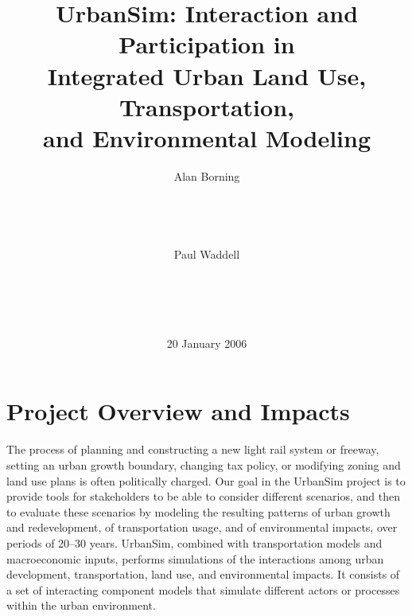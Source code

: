 \documentclass{acm_proc_article-sp}
\begin{document}
\pagestyle{plain}

\title{UrbanSim: Interaction and Participation in \\
       Integrated Urban Land Use, Transportation, \\ 
       and Environmental Modeling}


\author{
\alignauthor Alan Borning\\
       \\
       \\
       \\
       \\
\alignauthor Paul Waddell\\
       \\
       \\
       \\
       \\
}
\date{20 January 2006}




\maketitle

\section{Project Overview and Impacts}

The process of planning and constructing a new light rail system
or freeway, setting an urban growth boundary, changing tax policy,
or modifying zoning and land use plans is often politically
charged.  Our goal in the UrbanSim project is to provide tools for
stakeholders to be able to consider different
scenarios,
and then to evaluate these scenarios by modeling the resulting
patterns of urban growth and redevelopment, of transportation
usage, and of environmental
impacts, over periods of 20--30 years.  UrbanSim,
combined with
transportation models and macroeconomic inputs, performs
simulations of the interactions among urban development,
transportation, land use, and environmental impacts. It consists
of a set of interacting component models that simulate different
actors or processes within the urban environment.
\end{document}
